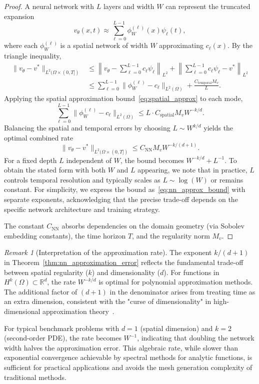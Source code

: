 \documentclass[11pt,reqno]{amsart}
\theoremstyle{plain}
\theoremstyle{definition}
\theoremstyle{remark}
\newtheorem{remark}[theorem]{Remark}
\begin{document}
\begin{proof}
\noindent A neural network with $L$ layers and width $W$ can represent the truncated expansion
\begin{equation}
    v_\theta(x,t) \approx \sum_{\ell=0}^{L-1} \phi_W^{(\ell)}(x) \psi_\ell(t),
\end{equation}
where each $\phi_W^{(\ell)}$ is a spatial network of width $W$ approximating $c_\ell(x)$. By the triangle inequality,
\begin{align}
    \|v_\theta - v^*\|_{L^2(\Omega \times (0,T])} 
    &\leq \left\| v_\theta - \sum_{\ell=0}^{L-1} c_\ell \psi_\ell \right\|_{L^2} + \left\| \sum_{\ell=0}^{L-1} c_\ell \psi_\ell - v^* \right\|_{L^2} \\
    &\leq \sum_{\ell=0}^{L-1} \|\phi_W^{(\ell)} - c_\ell\|_{L^2(\Omega)} + \frac{C_{\mathrm{temporal}} M_v}{L}.
\end{align}
Applying the spatial approximation bound~\eqref{eq:spatial_approx} to each mode,
\begin{equation}
    \sum_{\ell=0}^{L-1} \|\phi_W^{(\ell)} - c_\ell\|_{L^2(\Omega)} \leq L \cdot C_{\mathrm{spatial}} M_v W^{-k/d}.
\end{equation}
Balancing the spatial and temporal errors by choosing $L \sim W^{k/d}$ yields the optimal combined rate
\begin{equation}
    \|v_\theta - v^*\|_{L^2(\Omega \times (0,T])} \leq C_{\mathrm{NN}} M_v W^{-k/(d+1)}.
\end{equation}
For a fixed depth $L$ independent of $W$, the bound becomes $W^{-k/d} + L^{-1}$. To obtain the stated form with both $W$ and $L$ appearing, we note that in practice, $L$ controls temporal resolution and typically scales as $L \sim \log(W)$ or remains constant. For simplicity, we express the bound as~\eqref{eq:nn_approx_bound} with separate exponents, acknowledging that the precise trade-off depends on the specific network architecture and training strategy.

The constant $C_{\mathrm{NN}}$ absorbs dependencies on the domain geometry (via Sobolev embedding constants), the time horizon $T$, and the regularity norm $M_v$.
\end{proof}

\begin{remark}[Interpretation of the approximation rate]
The exponent $k/(d+1)$ in Theorem~\ref{thm:nn_approximation_error} reflects the fundamental trade-off between spatial regularity ($k$) and dimensionality ($d$). For functions in $H^k(\Omega) \subset \mathbb{R}^d$, the rate $W^{-k/d}$ is optimal for polynomial approximation methods. The additional factor of $(d+1)$ in the denominator arises from treating time as an extra dimension, consistent with the "curse of dimensionality" in high-dimensional approximation theory~\cite{devore2021}.

For typical benchmark problems with $d=1$ (spatial dimension) and $k=2$ (second-order PDE), the rate becomes $W^{-1}$, indicating that doubling the network width halves the approximation error. This algebraic rate, while slower than exponential convergence achievable by spectral methods for analytic functions, is sufficient for practical applications and avoids the mesh generation complexity of traditional methods.
\end{remark}
\end{document}

